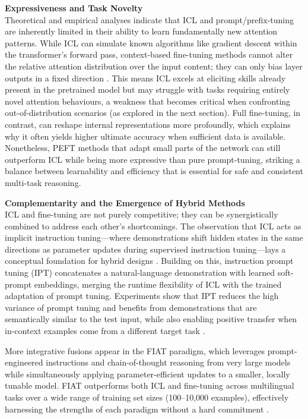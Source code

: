 \documentclass[11pt]{article}
\begin{document}
\textbf{Expressiveness and Task Novelty}\\
Theoretical and empirical analyses indicate that ICL and prompt/prefix-tuning are inherently limited in their ability to learn fundamentally new attention patterns. While ICL can simulate known algorithms like gradient descent within the transformer's forward pass, context-based fine-tuning methods cannot alter the relative attention distribution over the input content; they can only bias layer outputs in a fixed direction \cite{ref180}. This means ICL excels at eliciting skills already present in the pretrained model but may struggle with tasks requiring entirely novel attention behaviours, a weakness that becomes critical when confronting out-of-distribution scenarios (as explored in the next section). Full fine-tuning, in contrast, can reshape internal representations more profoundly, which explains why it often yields higher ultimate accuracy when sufficient data is available. Nonetheless, PEFT methods that adapt small parts of the network can still outperform ICL while being more expressive than pure prompt-tuning, striking a balance between learnability and efficiency that is essential for safe and consistent multi-task reasoning.

\textbf{Complementarity and the Emergence of Hybrid Methods}\\
ICL and fine-tuning are not purely competitive; they can be synergistically combined to address each other's shortcomings. The observation that ICL acts as implicit instruction tuning---where demonstrations shift hidden states in the same directions as parameter updates during supervised instruction tuning---lays a conceptual foundation for hybrid designs \cite{ref181}. Building on this, instruction prompt tuning (IPT) concatenates a natural-language demonstration with learned soft-prompt embeddings, merging the runtime flexibility of ICL with the trained adaptation of prompt tuning. Experiments show that IPT reduces the high variance of prompt tuning and benefits from demonstrations that are semantically similar to the test input, while also enabling positive transfer when in-context examples come from a different target task \cite{ref182}.

More integrative fusions appear in the FIAT paradigm, which leverages prompt-engineered instructions and chain-of-thought reasoning from very large models while simultaneously applying parameter-efficient updates to a smaller, locally tunable model. FIAT outperforms both ICL and fine-tuning across multilingual tasks over a wide range of training set sizes (100--10,000 examples), effectively harnessing the strengths of each paradigm without a hard commitment \cite{ref183}.
\end{document}
